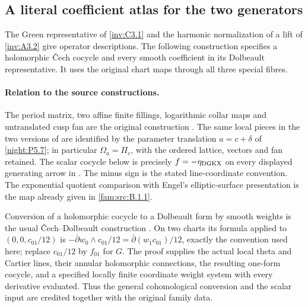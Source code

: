 \subsection{A literal coefficient atlas for the two generators}

The Green representative of \cref{inv:C3.1} and the harmonic
normalization of a lift of \cref{inv:A3.2} give operator descriptions.
The following construction specifies a holomorphic \v Cech
cocycle and every smooth coefficient in its Dolbeault representative.
It uses the original chart maps through all three special fibres.
\paragraph{Relation to the source constructions.}
The period matrix, two affine finite fillings, logarithmic collar maps
and untranslated cusp fan are the original construction
\cite[Sections~3--6]{AC2026}.  The same local pieces in the two
versions of \cite{DuEtAl2026v1,DuEtAl2026v2} are identified by the
parameter translation $a=c+\delta$ of \cref{night:P5.7}; in particular
$\Omega_a=\Pi_c$, with the ordered lattice, vectors and fan retained.
The scalar cocycle below is precisely $f=-\eta_{\rm DGKX}$ on every
displayed generating arrow in
\cite[Section~6.4, the scalar cocycle preceding Lemma~6.14]{DuEtAl2026v1}.
The minus sign is the stated line-coordinate convention.  The
exponential quotient comparison with Engel's elliptic-surface
presentation is the map already given in
\cref{fam:src:B.1.1}.

Conversion of a holomorphic cocycle to a Dolbeault form by smooth
weights is the usual \v Cech--Dolbeault construction
\cite[Theorem~3.1 and proof, p.~10]{AbateBracciSuwaTovena2010Atiyah}.
On two charts its formula applied to $(0,0,c_{01}/12)$ is
$-\bar\partial w_0\wedge c_{01}/12
=\bar\partial(w_1c_{01})/12$, exactly the convention used here;
replace $c_{01}/12$ by $f_{01}$ for $G$.
The proof supplies the actual local theta and Cartier lines, their
annular holomorphic connections, the resulting one-form cocycle,
and a specified locally finite coordinate weight system with every
derivative evaluated.  Thus the general cohomological conversion and
the scalar input are credited together with the original family data.


